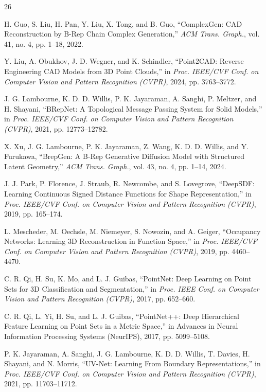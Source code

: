 \documentclass{ieeeaccess}
\begin{document}
\begin{thebibliography}{26}

H. Guo, S. Liu, H. Pan, Y. Liu, X. Tong, and B. Guo,
``ComplexGen: CAD Reconstruction by B-Rep Chain Complex Generation,''
\emph{ACM Trans. Graph.}, vol. 41, no. 4, pp. 1--18, 2022.

Y. Liu, A. Obukhov, J. D. Wegner, and K. Schindler,
``Point2CAD: Reverse Engineering CAD Models from 3D Point Clouds,''
in \emph{Proc. IEEE/CVF Conf. on Computer Vision and Pattern Recognition (CVPR)}, 2024, pp. 3763--3772.

J. G. Lambourne, K. D. D. Willis, P. K. Jayaraman, A. Sanghi, P. Meltzer, and H. Shayani,
``BRepNet: A Topological Message Passing System for Solid Models,''
in \emph{Proc. IEEE/CVF Conf. on Computer Vision and Pattern Recognition (CVPR)}, 2021, pp. 12773--12782.

X. Xu, J. G. Lambourne, P. K. Jayaraman, Z. Wang, K. D. D. Willis, and Y. Furukawa,
``BrepGen: A B-Rep Generative Diffusion Model with Structured Latent Geometry,''
\emph{ACM Trans. Graph.}, vol. 43, no. 4, pp. 1--14, 2024.

J. J. Park, P. Florence, J. Straub, R. Newcombe, and S. Lovegrove,
``DeepSDF: Learning Continuous Signed Distance Functions for Shape Representation,''
in \emph{Proc. IEEE/CVF Conf. on Computer Vision and Pattern Recognition (CVPR)}, 2019, pp. 165--174.

L. Mescheder, M. Oechsle, M. Niemeyer, S. Nowozin, and A. Geiger,
``Occupancy Networks: Learning 3D Reconstruction in Function Space,''
in \emph{Proc. IEEE/CVF Conf. on Computer Vision and Pattern Recognition (CVPR)}, 2019, pp. 4460--4470.

C. R. Qi, H. Su, K. Mo, and L. J. Guibas,
``PointNet: Deep Learning on Point Sets for 3D Classification and Segmentation,''
in \emph{Proc. IEEE Conf. on Computer Vision and Pattern Recognition (CVPR)}, 2017, pp. 652--660.

C. R. Qi, L. Yi, H. Su, and L. J. Guibas,
``PointNet++: Deep Hierarchical Feature Learning on Point Sets in a Metric Space,''
in Advances in Neural Information Processing Systems (NeurIPS), 2017, pp. 5099--5108.

P. K. Jayaraman, A. Sanghi, J. G. Lambourne, K. D. D. Willis, T. Davies, H. Shayani, and N. Morris,
``UV-Net: Learning From Boundary Representations,''
in \emph{Proc. IEEE/CVF Conf. on Computer Vision and Pattern Recognition (CVPR)}, 2021, pp. 11703--11712.


\end{thebibliography}
\end{document}
